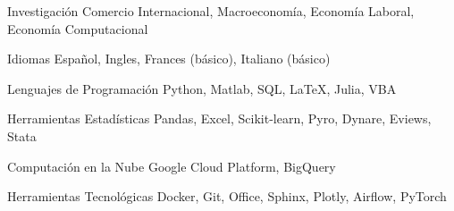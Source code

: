 

\begin{cvskills}

\cvskill
    {Investigación} %
    {Comercio Internacional, Macroeconomía, Economía Laboral, Economía Computacional} %

\cvskill
    {Idiomas} %
    {Español, Ingles, Frances (básico), Italiano (básico)} %

\cvskill
    {Lenguajes de Programación} %
    {Python, Matlab, SQL, LaTeX, Julia, VBA} %

\cvskill
    {Herramientas Estadísticas} %
    {Pandas, Excel, Scikit-learn, Pyro, Dynare, Eviews, Stata} %

\cvskill
    {Computación en la Nube} %
    {Google Cloud Platform, BigQuery} %

\cvskill
    {Herramientas Tecnológicas} %
    {Docker, Git, Office, Sphinx, Plotly, Airflow, PyTorch} %

\end{cvskills}

